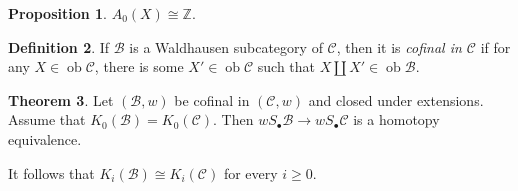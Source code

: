 \documentclass[10pt,letterpaper,cm]{nupset}
\theoremstyle{definition}
\newtheorem{definition}{Definition}
\theoremstyle{theorem}
\newtheorem{theorem}[definition]{Theorem}
\newtheorem{prop}[definition]{Proposition}
\theoremstyle{remark}
\newcommand{\Z}{\mathbb Z}
\newcommand{\1}{\mathbf{1}}
\renewcommand{\b}{\mathscr{B}}
\renewcommand{\c}{\mathscr{C}}
\newcommand{\0}{\vec 0}
\DeclareMathOperator{\ob}{ob}
\begin{document}
\begin{prop}
$A_0(X)\cong \Z$.
\end{prop}

\begin{definition}
If $\b$ is a Waldhausen subcategory of $\c$, then it is \textit{cofinal in $\c$} if for any $X \in \ob \c$, there is some $X' \in \ob \c$ such that $X \coprod X' \in \ob \b$.
\end{definition}

\begin{theorem}
Let $\left(\b, w\right)$ be cofinal in $\left(\c, w\right)$ and closed under extensions. Assume that $K_0(\b) = K_0(\c)$. Then $wS_{\bullet}\b \to wS_{\bullet}\c$ is a homotopy equivalence.
\end{theorem}

\smallskip

It follows that $K_i(\b) \cong K_i(\c)$ for every $i\geq 0$.
\end{document}
